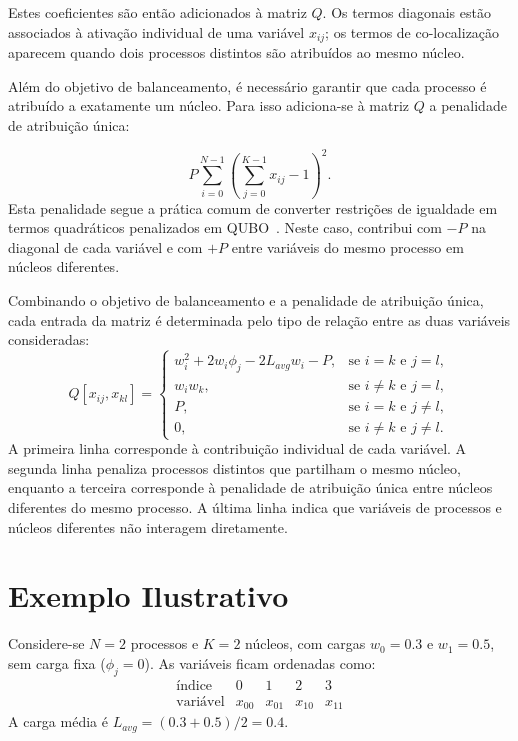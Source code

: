 Estes coeficientes são então
adicionados à matriz $Q$. Os termos diagonais estão associados
à ativação individual de uma variável $x_{ij}$; os termos de co-localização aparecem
quando dois processos distintos são atribuídos ao mesmo núcleo.

Além do objetivo de balanceamento, é necessário garantir que cada processo é atribuído a
exatamente um núcleo. Para isso adiciona-se à matriz $Q$ a penalidade de atribuição única:

\begin{equation}
    P \sum_{i=0}^{N-1}\left(\sum_{j=0}^{K-1}x_{ij} - 1\right)^2.
\end{equation}
Esta penalidade segue a prática comum de converter restrições de igualdade em termos
quadráticos penalizados em \acs{QUBO}~\cite{Glover2019QUBO}. Neste caso, contribui com $-P$
na diagonal de cada variável e com $+P$ entre variáveis do mesmo processo em núcleos diferentes.

Combinando o objetivo de balanceamento e a penalidade de atribuição única, cada entrada da matriz
é determinada pelo tipo de relação entre as duas variáveis consideradas:
\begin{equation}
Q[x_{ij},x_{kl}] =
\begin{cases}
w_i^2 + 2w_i\phi_j - 2L_{avg}w_i - P, & \text{se } i=k \text{ e } j=l,\\
w_iw_k, & \text{se } i \neq k \text{ e } j=l,\\
P, & \text{se } i=k \text{ e } j \neq l,\\
0, & \text{se } i \neq k \text{ e } j \neq l.
\end{cases}
\end{equation}
A primeira linha corresponde à contribuição individual de cada variável. A segunda
linha penaliza processos distintos que partilham o mesmo núcleo, enquanto a terceira
corresponde à penalidade de atribuição única entre núcleos diferentes do mesmo processo. A última
linha indica que variáveis de processos e núcleos diferentes não interagem diretamente.

\section{Exemplo Ilustrativo}
\label{sec:exemplo-qubo}

Considere-se $N=2$ processos e $K=2$ núcleos, com cargas $w_0=0.3$ e $w_1=0.5$,
sem carga fixa ($\phi_j=0$). As variáveis ficam ordenadas como:
\begin{equation}
\begin{array}{c|cccc}
\text{índice} & 0 & 1 & 2 & 3 \\
\hline
\text{variável} & x_{00} & x_{01} & x_{10} & x_{11}
\end{array}
\end{equation}
A carga média é $L_{avg}=(0.3+0.5)/2=0.4$.

